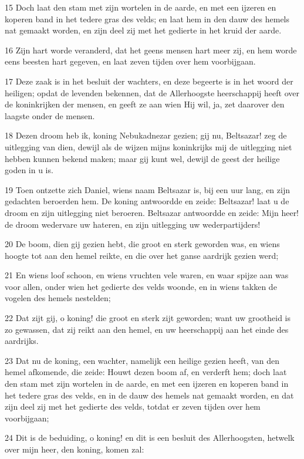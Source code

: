 \par 15 Doch laat den stam met zijn wortelen in de aarde, en met een ijzeren en koperen band in het tedere gras des velds; en laat hem in den dauw des hemels nat gemaakt worden, en zijn deel zij met het gedierte in het kruid der aarde.
\par 16 Zijn hart worde veranderd, dat het geens mensen hart meer zij, en hem worde eens beesten hart gegeven, en laat zeven tijden over hem voorbijgaan.
\par 17 Deze zaak is in het besluit der wachters, en deze begeerte is in het woord der heiligen; opdat de levenden bekennen, dat de Allerhoogste heerschappij heeft over de koninkrijken der mensen, en geeft ze aan wien Hij wil, ja, zet daarover den laagste onder de mensen.
\par 18 Dezen droom heb ik, koning Nebukadnezar gezien; gij nu, Beltsazar! zeg de uitlegging van dien, dewijl als de wijzen mijns koninkrijks mij de uitlegging niet hebben kunnen bekend maken; maar gij kunt wel, dewijl de geest der heilige goden in u is.
\par 19 Toen ontzette zich Daniel, wiens naam Beltsazar is, bij een uur lang, en zijn gedachten beroerden hem. De koning antwoordde en zeide: Beltsazar! laat u de droom en zijn uitlegging niet beroeren. Beltsazar antwoordde en zeide: Mijn heer! de droom wedervare uw hateren, en zijn uitlegging uw wederpartijders!
\par 20 De boom, dien gij gezien hebt, die groot en sterk geworden was, en wiens hoogte tot aan den hemel reikte, en die over het ganse aardrijk gezien werd;
\par 21 En wiens loof schoon, en wiens vruchten vele waren, en waar spijze aan was voor allen, onder wien het gedierte des velds woonde, en in wiens takken de vogelen des hemels nestelden;
\par 22 Dat zijt gij, o koning! die groot en sterk zijt geworden; want uw grootheid is zo gewassen, dat zij reikt aan den hemel, en uw heerschappij aan het einde des aardrijks.
\par 23 Dat nu de koning, een wachter, namelijk een heilige gezien heeft, van den hemel afkomende, die zeide: Houwt dezen boom af, en verderft hem; doch laat den stam met zijn wortelen in de aarde, en met een ijzeren en koperen band in het tedere gras des velds, en in de dauw des hemels nat gemaakt worden, en dat zijn deel zij met het gedierte des velds, totdat er zeven tijden over hem voorbijgaan;
\par 24 Dit is de beduiding, o koning! en dit is een besluit des Allerhoogsten, hetwelk over mijn heer, den koning, komen zal:
